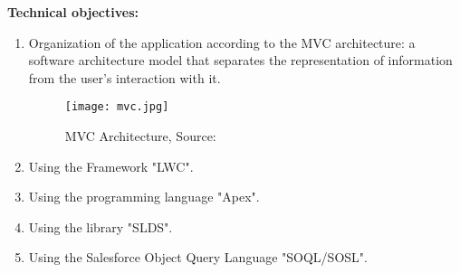\textbf{Technical objectives:}
\begin{enumerate}
\item Organization of the application according to the MVC architecture: a software architecture model that separates the representation of information from the user's interaction with it.

\begin{figure}[H]%
    \center   
    \texttt{[image: mvc.jpg]}
    \caption{MVC Architecture, Source: \cite{6}}
\end{figure}

\item Using the Framework "LWC".
\item Using the programming language "Apex".
\item Using the library "SLDS".
\item Using the Salesforce Object Query Language "SOQL/SOSL".

\end{enumerate}
